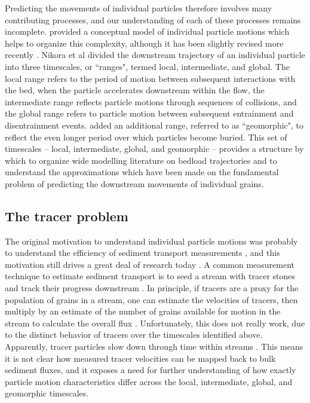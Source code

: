 Predicting the movements of individual particles therefore involves many contributing processes, and our understanding of each of these processes remains incomplete.
\citet{Nikora2001,Nikora2002} provided a conceptual model of individual particle motions which helps to organize this complexity, although it has been slightly revised more recently \citep{Campagnol2013, Hassan2017, Pierce2020}.
Nikora et al divided the downstream trajectory of an individual particle into three timescales, or ``ranges", termed local, intermediate, and global.
The local range refers to the period of motion between subsequent interactions with the bed, when the particle accelerates downstream within the flow, the intermediate range reflects particle motions through sequences of collisions, and the global range refers to particle motion between subsequent entrainment and disentrainment events.
\citet{Hassan2017} added an additional range, referred to as ``geomorphic", to reflect the even longer period over which particles become buried. 
This set of timescales -- local, intermediate, global, and geomorphic -- provides a structure by which to organize wide modelling literature on bedload trajectories and to understand the approximations which have been made on the fundamental problem of predicting the downstream movements of individual grains.


\subsection{The tracer problem}
The original motivation to understand individual particle motions was probably to understand the efficiency of sediment transport measurements \citep{Ettema2004}, and this motivation still drives a great deal of research today \citep{Hassan2017,Pretzlav2021}.
A common measurement technique to estimate sediment transport is to seed a stream with tracer stones and track their progress downstream \citep{Einstein1937, Takayama1966, Ashmore2020}.
In principle, if tracers are a proxy for the population of grains in a stream, one can estimate the velocities of tracers, then multiply by an estimate of the number of grains available for motion in the stream to calculate the overall flux \citep{Yano1969,Nakagawa1976,Hassan2017}.
Unfortunately, this does not really work, due to the distinct behavior of tracers over the timescales identified above. Apparently, tracer particles slow down through time within streams \citep{Ferguson2002,Haschenberger2012}. This means it is not clear how measured tracer velocities can be mapped back to bulk sediment fluxes, and it exposes a need for further understanding of how exactly particle motion characteristics differ across the local, intermediate, global, and geomorphic timescales.


